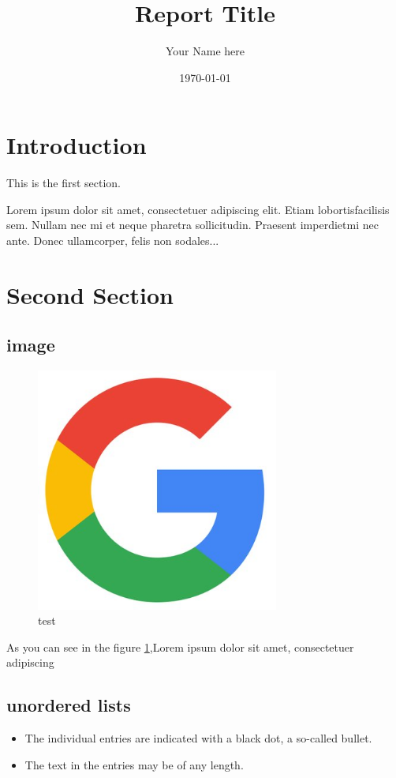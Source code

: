 \documentclass{article}
\title{Report Title}
\author{Your Name here}
\date{\today}
\begin{document}
     
\maketitle
     
\tableofcontents
     
\section{Introduction}
     
This is the first section.
     
Lorem  ipsum  dolor  sit  amet,  consectetuer  adipiscing  
elit.   Etiam  lobortisfacilisis sem.  Nullam nec mi et 
neque pharetra sollicitudin.  Praesent imperdietmi nec ante. \cite{alur:2015:cps}
Donec ullamcorper, felis non sodales...
     
\section{Second Section}
\subsection{image}
\begin{figure}[htbp]
    \centering
    \includegraphics[width=8cm]{gg}
    \caption{test}
    \label{fig:gg}
\end{figure}
As you can see in the figure \ref{fig:gg},Lorem  ipsum  dolor  sit  amet,  consectetuer  adipiscing  
\subsection{unordered lists}
\begin{itemize}
    \item The individual entries are indicated with a black dot, a so-called bullet.
    \item The text in the entries may be of any length.
\end{itemize}
\end{document}
